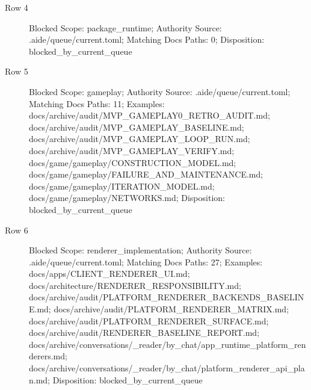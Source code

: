 \documentclass[9pt,a4paper,openany]{book}
\begin{document}
\begin{description}
\item[Row 4] Blocked Scope: package\_\allowbreak{}runtime; Authority Source: .\allowbreak{}aide/\allowbreak{}queue/\allowbreak{}current.\allowbreak{}toml; Matching Docs Paths: 0; Disposition: blocked\_\allowbreak{}by\_\allowbreak{}current\_\allowbreak{}queue
\item[Row 5] Blocked Scope: gameplay; Authority Source: .\allowbreak{}aide/\allowbreak{}queue/\allowbreak{}current.\allowbreak{}toml; Matching Docs Paths: 11; Examples: docs/\allowbreak{}archive/\allowbreak{}audit/\allowbreak{}MVP\_\allowbreak{}GAMEPLAY0\_\allowbreak{}RETRO\_\allowbreak{}AUDIT.\allowbreak{}md; docs/\allowbreak{}archive/\allowbreak{}audit/\allowbreak{}MVP\_\allowbreak{}GAMEPLAY\_\allowbreak{}BASELINE.\allowbreak{}md; docs/\allowbreak{}archive/\allowbreak{}audit/\allowbreak{}MVP\_\allowbreak{}GAMEPLAY\_\allowbreak{}LOOP\_\allowbreak{}RUN.\allowbreak{}md; docs/\allowbreak{}archive/\allowbreak{}audit/\allowbreak{}MVP\_\allowbreak{}GAMEPLAY\_\allowbreak{}VERIFY.\allowbreak{}md; docs/\allowbreak{}game/\allowbreak{}gameplay/\allowbreak{}CONSTRUCTION\_\allowbreak{}MODEL.\allowbreak{}md; docs/\allowbreak{}game/\allowbreak{}gameplay/\allowbreak{}FAILURE\_\allowbreak{}AND\_\allowbreak{}MAINTENANCE.\allowbreak{}md; docs/\allowbreak{}game/\allowbreak{}gameplay/\allowbreak{}ITERATION\_\allowbreak{}MODEL.\allowbreak{}md; docs/\allowbreak{}game/\allowbreak{}gameplay/\allowbreak{}NETWORKS.\allowbreak{}md; Disposition: blocked\_\allowbreak{}by\_\allowbreak{}current\_\allowbreak{}queue
\item[Row 6] Blocked Scope: renderer\_\allowbreak{}implementation; Authority Source: .\allowbreak{}aide/\allowbreak{}queue/\allowbreak{}current.\allowbreak{}toml; Matching Docs Paths: 27; Examples: docs/\allowbreak{}apps/\allowbreak{}CLIENT\_\allowbreak{}RENDERER\_\allowbreak{}UI.\allowbreak{}md; docs/\allowbreak{}architecture/\allowbreak{}RENDERER\_\allowbreak{}RESPONSIBILITY.\allowbreak{}md; docs/\allowbreak{}archive/\allowbreak{}audit/\allowbreak{}PLATFORM\_\allowbreak{}RENDERER\_\allowbreak{}BACKENDS\_\allowbreak{}BASELINE.\allowbreak{}md; docs/\allowbreak{}archive/\allowbreak{}audit/\allowbreak{}PLATFORM\_\allowbreak{}RENDERER\_\allowbreak{}MATRIX.\allowbreak{}md; docs/\allowbreak{}archive/\allowbreak{}audit/\allowbreak{}PLATFORM\_\allowbreak{}RENDERER\_\allowbreak{}SURFACE.\allowbreak{}md; docs/\allowbreak{}archive/\allowbreak{}audit/\allowbreak{}RENDERER\_\allowbreak{}BASELINE\_\allowbreak{}REPORT.\allowbreak{}md; docs/\allowbreak{}archive/\allowbreak{}conversations/\allowbreak{}\_\allowbreak{}reader/\allowbreak{}by\_\allowbreak{}chat/\allowbreak{}app\_\allowbreak{}runtime\_\allowbreak{}platform\_\allowbreak{}renderers.\allowbreak{}md; docs/\allowbreak{}archive/\allowbreak{}conversations/\allowbreak{}\_\allowbreak{}reader/\allowbreak{}by\_\allowbreak{}chat/\allowbreak{}platform\_\allowbreak{}renderer\_\allowbreak{}api\_\allowbreak{}plan.\allowbreak{}md; Disposition: blocked\_\allowbreak{}by\_\allowbreak{}current\_\allowbreak{}queue

\end{description}
\end{document}
